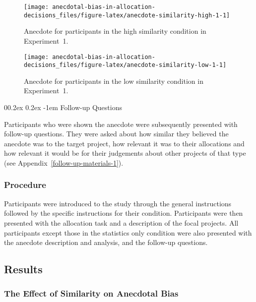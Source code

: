 \documentclass[
  man, donotrepeattitle,floatsintext]{apa7}
\makeatletter
\let\oldparagraph\paragraph
\renewcommand{\paragraph}[1]{\oldparagraph{#1}\mbox{}}
\renewcommand{\paragraph}{\@startsection{paragraph}{4}{\parindent}%
  {0\baselineskip \@plus 0.2ex \@minus 0.2ex}%
  {-1em}%
  {\normalfont\normalsize\bfseries\itshape\typesectitle}}
\theoremstyle{definition}
\theoremstyle{definition}
\theoremstyle{definition}
\theoremstyle{definition}
\theoremstyle{remark}
\makeatother
\begin{document}
\begin{figure}
\texttt{[image: anecdotal-bias-in-allocation-decisions\_files/figure-latex/anecdote-similarity-high-1-1]} \caption{Anecdote for participants in the high similarity condition in Experiment~1.}\label{fig:anecdote-similarity-high-1}
\end{figure}



\begin{figure}
\texttt{[image: anecdotal-bias-in-allocation-decisions\_files/figure-latex/anecdote-similarity-low-1-1]} \caption{Anecdote for participants in the low similarity condition in Experiment~1.}\label{fig:anecdote-similarity-low-1}
\end{figure}

\hypertarget{follow-up-questions}{%
\paragraph{Follow-up Questions}\label{follow-up-questions}}

Participants who were shown the anecdote were subsequently presented with
follow-up questions. They were asked about how similar they believed the
anecdote was to the target project, how relevant it was to their allocations and
how relevant it would be for their judgements about other projects of that type
(see Appendix~\ref{follow-up-materials-1}).

\hypertarget{procedure}{%
\subsubsection{Procedure}\label{procedure}}

Participants were introduced to the study through the general instructions
followed by the specific instructions for their condition. Participants were
then presented with the allocation task and a description of the focal projects.
All participants except those in the statistics only condition were also
presented with the anecdote description and analysis, and the follow-up
questions.

\hypertarget{results-anecdotes-1}{%
\subsection{Results}\label{results-anecdotes-1}}

\hypertarget{the-effect-of-similarity-on-anecdotal-bias}{%
\subsubsection{The Effect of Similarity on Anecdotal Bias}\label{the-effect-of-similarity-on-anecdotal-bias}}
\end{document}
